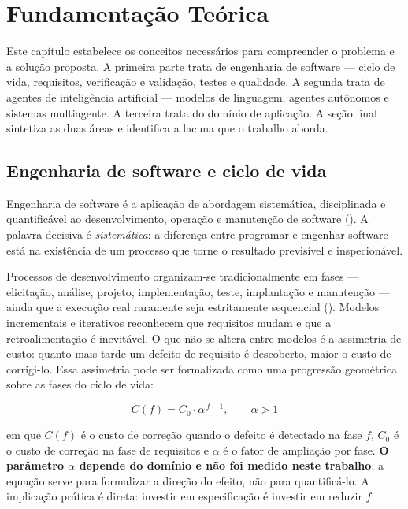 
\chapter{Fundamentação Teórica}
\label{cap:fundamentacao}

Este capítulo estabelece os conceitos necessários para compreender o problema e a
solução proposta. A primeira parte trata de engenharia de software --- ciclo de
vida, requisitos, verificação e validação, testes e qualidade. A segunda trata de
agentes de inteligência artificial --- modelos de linguagem, agentes autônomos e
sistemas multiagente. A terceira trata do domínio de aplicação. A seção final
sintetiza as duas áreas e identifica a lacuna que o trabalho aborda.

\section{Engenharia de software e ciclo de vida}
\label{sec:ciclo-de-vida}

Engenharia de software é a aplicação de abordagem sistemática, disciplinada e
quantificável ao desenvolvimento, operação e manutenção de software
(). A palavra decisiva é \emph{sistemática}: a
diferença entre programar e engenhar software está na existência de um processo
que torne o resultado previsível e inspecionável.

Processos de desenvolvimento organizam-se tradicionalmente em fases ---
elicitação, análise, projeto, implementação, teste, implantação e manutenção ---
ainda que a execução real raramente seja estritamente sequencial
(). Modelos incrementais e iterativos reconhecem que
requisitos mudam e que a retroalimentação é inevitável. O que não se altera entre
modelos é a assimetria de custo: quanto mais tarde um defeito de requisito é
descoberto, maior o custo de corrigi-lo. Essa assimetria pode ser formalizada
como uma progressão geométrica sobre as fases do ciclo de vida:

\begin{equation}
	C(f) = C_0 \cdot \alpha^{\,f-1}, \qquad \alpha > 1
	\label{eq:custo-fase}
\end{equation}

\noindent em que $C(f)$ é o custo de correção quando o defeito é detectado na
fase $f$, $C_0$ é o custo de correção na fase de requisitos e $\alpha$ é o fator
de ampliação por fase. \textbf{O parâmetro $\alpha$ depende do domínio e não foi
medido neste trabalho}; a equação serve para formalizar a direção do efeito, não
para quantificá-lo. A implicação prática é direta: investir em especificação é
investir em reduzir $f$.

